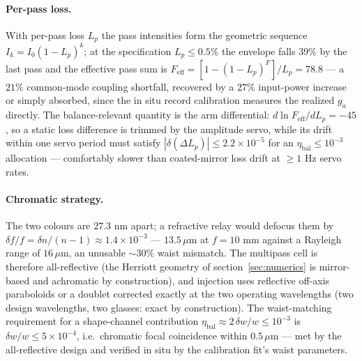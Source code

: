 \documentclass[11pt,a4paper]{article}
\begin{document}
\paragraph{Per-pass loss.} With per-pass loss $L_p$ the pass intensities form the geometric sequence $I_k = I_0(1-L_p)^k$; at the specification $L_p \leq 0.5\%$ the envelope falls $39\%$ by the last pass and the effective pass sum is $F_\text{eff} = [1-(1-L_p)^F]/L_p = 78.8$ --- a $21\%$ common-mode coupling shortfall, recovered by a $27\%$ input-power increase or simply absorbed, since the in situ record calibration measures the realized $g_a$ directly. The balance-relevant quantity is the arm differential: $d\ln F_\text{eff}/dL_p = -45$, so a static loss difference is trimmed by the amplitude servo, while its drift within one servo period must satisfy $|\delta(\Delta L_p)| \leq 2.2\times 10^{-5}$ for an $\eta_\text{bal} \leq 10^{-3}$ allocation --- comfortably slower than coated-mirror loss drift at $\geq 1$ Hz servo rates.

\paragraph{Chromatic strategy.} The two colours are $27.3$ nm apart; a refractive relay would defocus them by $\delta f/f = \delta n/(n-1) \approx 1.4\times 10^{-3}$ --- $13.5\,\mu$m at $f = 10$ mm against a Rayleigh range of $16\,\mu$m, an unusable $\sim 30\%$ waist mismatch. The multipass cell is therefore all-reflective (the Herriott geometry of section~\ref{sec:numerics} is mirror-based and achromatic by construction), and injection uses reflective off-axis paraboloids or a doublet corrected exactly at the two operating wavelengths (two design wavelengths, two glasses: exact by construction). The waist-matching requirement for a shape-channel contribution $\eta_\text{bal} \approx 2\,\delta w/w \leq 10^{-3}$ is $\delta w/w \leq 5\times 10^{-4}$, i.e.\ chromatic focal coincidence within $0.5\,\mu$m --- met by the all-reflective design and verified in situ by the calibration fit's waist parameters.
\end{document}
